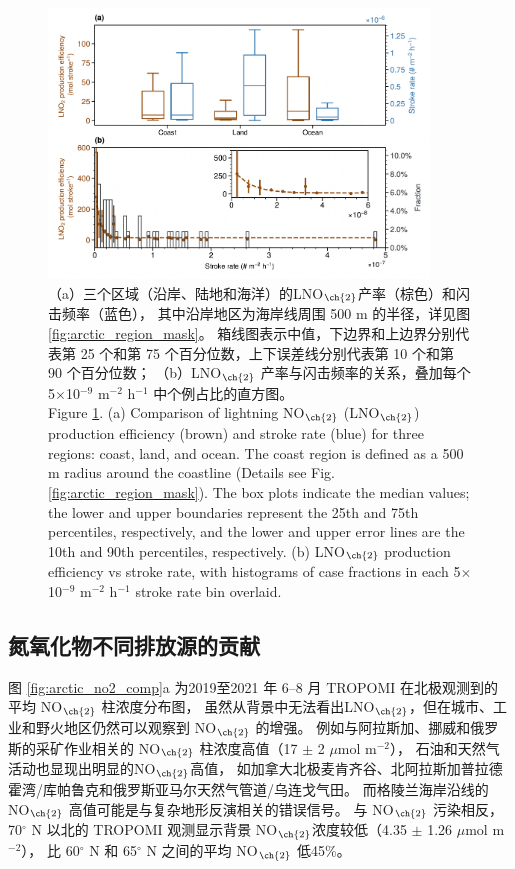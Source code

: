 \begin{figure}[H]
\centering
\includegraphics[width=0.9\textwidth]{./figures/arctic_pe_rate.png}
\caption{
（a）三个区域（沿岸、陆地和海洋）的LNO$_{\ch{2}}$产率（棕色）和闪击频率（蓝色），
其中沿岸地区为海岸线周围 500 m 的半径，详见图\ref{fig:arctic_region_mask}。
箱线图表示中值，下边界和上边界分别代表第 25 个和第 75 个百分位数，上下误差线分别代表第 10 个和第 90 个百分位数；
（b）LNO$_{\ch{2}}$ 产率与闪击频率的关系，叠加每个 5$\times$10$^{-9}$ m$^{-2}$ h$^{-1}$ 中个例占比的直方图。 \\
Figure \ref{fig:arctic_pe_rate}. (a) Comparison of lightning NO$_{\ch{2}}$ (LNO$_{\ch{2}}$) production efficiency (brown) and stroke rate (blue) for three regions: coast, land, and ocean.
The coast region is defined as a 500 m radius around the coastline (Details see Fig. \ref{fig:arctic_region_mask}).
The box plots indicate the median values; the lower and upper boundaries represent the 25th and 75th percentiles, respectively, and the lower and upper error lines are the 10th and 90th percentiles, respectively.
(b) LNO$_{\ch{2}}$ production efficiency vs stroke rate, with histograms of case fractions in each 5$\times$10$^{-9}$ m$^{-2}$ h$^{-1}$ stroke rate bin overlaid.
}
\label{fig:arctic_pe_rate}
\end{figure}

\subsection{氮氧化物不同排放源的贡献}


图 \ref{fig:arctic_no2_comp}a 为2019至2021 年 6--8 月 TROPOMI 在北极观测到的平均 NO$_{\ch{2}}$ 柱浓度分布图，
虽然从背景中无法看出LNO$_{\ch{2}}$，但在城市、工业和野火地区仍然可以观察到 NO$_{\ch{2}}$ 的增强。
例如与阿拉斯加、挪威和俄罗斯的采矿作业相关的 NO$_{\ch{2}}$ 柱浓度高值（17 $\pm$ 2 $\mu$mol m$^{-2}$），
石油和天然气活动也显现出明显的NO$_{\ch{2}}$高值，
如加拿大北极麦肯齐谷、北阿拉斯加普拉德霍湾/库帕鲁克和俄罗斯亚马尔天然气管道/乌连戈气田\citep{VanDerA.2020}。
而格陵兰海岸沿线的 NO$_{\ch{2}}$ 高值可能是与复杂地形反演相关的错误信号\citep{Hachmeister.2022}。
与 NO$_{\ch{2}}$ 污染相反，70$^{\circ}$ N 以北的 TROPOMI 观测显示背景 NO$_{\ch{2}}$浓度较低（4.35 $\pm$ 1.26 $\mu$mol m$^{-2}$），
比 60$^{\circ}$ N 和 65$^{\circ}$ N 之间的平均 NO$_{\ch{2}}$ 低45\%。


